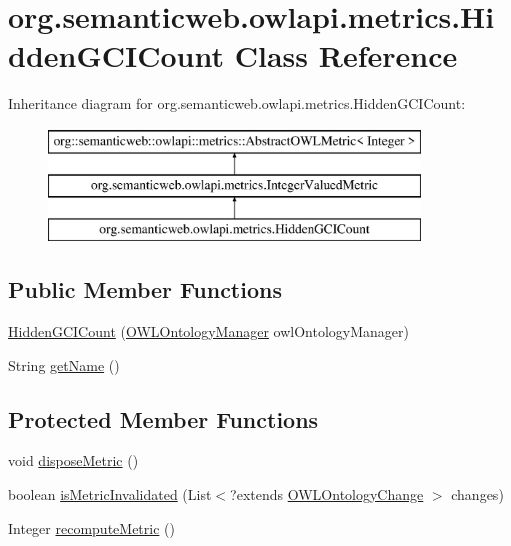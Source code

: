 \hypertarget{classorg_1_1semanticweb_1_1owlapi_1_1metrics_1_1_hidden_g_c_i_count}{\section{org.\-semanticweb.\-owlapi.\-metrics.\-Hidden\-G\-C\-I\-Count Class Reference}
\label{classorg_1_1semanticweb_1_1owlapi_1_1metrics_1_1_hidden_g_c_i_count}
}
Inheritance diagram for org.\-semanticweb.\-owlapi.\-metrics.\-Hidden\-G\-C\-I\-Count\-:\begin{figure}[H]
\begin{center}
\leavevmode
\includegraphics[height=3.000000cm]{classorg_1_1semanticweb_1_1owlapi_1_1metrics_1_1_hidden_g_c_i_count}
\end{center}
\end{figure}
\subsection*{Public Member Functions}
\begin{DoxyCompactItemize}
\item 
\hyperlink{classorg_1_1semanticweb_1_1owlapi_1_1metrics_1_1_hidden_g_c_i_count_a0142cf98a8dc1d1e63ff331166eda4bc}{Hidden\-G\-C\-I\-Count} (\hyperlink{interfaceorg_1_1semanticweb_1_1owlapi_1_1model_1_1_o_w_l_ontology_manager}{O\-W\-L\-Ontology\-Manager} owl\-Ontology\-Manager)
\item 
String \hyperlink{classorg_1_1semanticweb_1_1owlapi_1_1metrics_1_1_hidden_g_c_i_count_aebb6507e9116c30d0fb83bf97718638b}{get\-Name} ()
\end{DoxyCompactItemize}
\subsection*{Protected Member Functions}
\begin{DoxyCompactItemize}
\item 
void \hyperlink{classorg_1_1semanticweb_1_1owlapi_1_1metrics_1_1_hidden_g_c_i_count_acabe3a2b995a0041d62e162ec0d12b55}{dispose\-Metric} ()
\item 
boolean \hyperlink{classorg_1_1semanticweb_1_1owlapi_1_1metrics_1_1_hidden_g_c_i_count_a8de47ea9465bda519c4d34cef47ee32b}{is\-Metric\-Invalidated} (List$<$?extends \hyperlink{classorg_1_1semanticweb_1_1owlapi_1_1model_1_1_o_w_l_ontology_change}{O\-W\-L\-Ontology\-Change} $>$ changes)
\item 
Integer \hyperlink{classorg_1_1semanticweb_1_1owlapi_1_1metrics_1_1_hidden_g_c_i_count_a2b1e307dbe3df3462e1f586916cb1950}{recompute\-Metric} ()
\end{DoxyCompactItemize}


